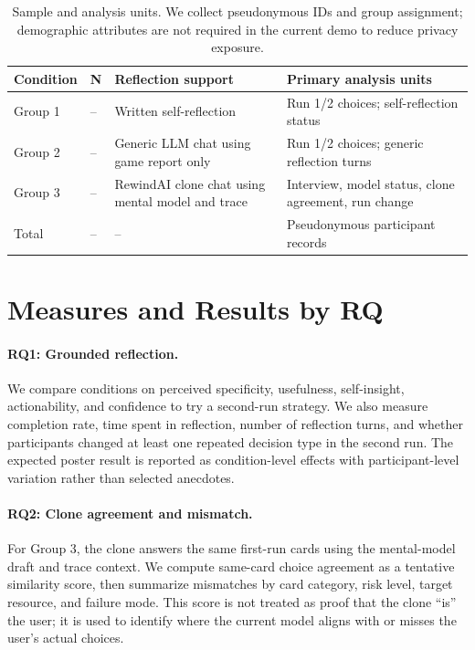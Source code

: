 \documentclass[sigconf,review,anonymous]{acmart}
\newcommand{\Nself}{--}
\newcommand{\Ngeneric}{--}
\newcommand{\Nrewind}{--}
\newcommand{\Ntotal}{--}
\begin{document}
\begin{table}[t]
  \caption{Sample and analysis units. We collect pseudonymous IDs and group assignment; demographic attributes are not required in the current demo to reduce privacy exposure.}
  \label{tab:sample}
  \centering
  \scriptsize
  \begin{tabular}{@{}p{}p{}p{}p{}@{}}
    \toprule
    \textbf{Condition} & \textbf{N} & \textbf{Reflection support} & \textbf{Primary analysis units} \\
    \midrule
    Group 1 & \Nself & Written self-reflection & Run 1/2 choices; self-reflection status \\
    Group 2 & \Ngeneric & Generic LLM chat using game report only & Run 1/2 choices; generic reflection turns \\
    Group 3 & \Nrewind & RewindAI clone chat using mental model and trace & Interview, model status, clone agreement, run change \\
    \midrule
    Total & \Ntotal & -- & Pseudonymous participant records \\
    \bottomrule
  \end{tabular}
\end{table}

\section{Measures and Results by RQ}

\paragraph{RQ1: Grounded reflection.}
We compare conditions on perceived specificity, usefulness, self-insight, actionability, and confidence to try a second-run strategy. We also measure completion rate, time spent in reflection, number of reflection turns, and whether participants changed at least one repeated decision type in the second run. The expected poster result is reported as condition-level effects with participant-level variation rather than selected anecdotes.

\paragraph{RQ2: Clone agreement and mismatch.}
For Group 3, the clone answers the same first-run cards using the mental-model draft and trace context. We compute same-card choice agreement as a tentative similarity score, then summarize mismatches by card category, risk level, target resource, and failure mode. This score is not treated as proof that the clone ``is'' the user; it is used to identify where the current model aligns with or misses the user's actual choices.
\end{document}

